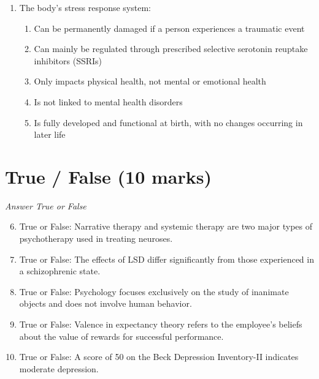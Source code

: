 \documentclass[12pt]{article}
\begin{document}
\begin{enumerate}[label=\arabic*.]
\begin{enumerate}[label=(\alph*)]
    \item Stimulant medications are typically employed to reduce anxiety
    \item Antibiotics are used in the treatment of anxiety
    \item Antifungal drugs are used to treat anxiety disorders
    \item Anti-inflammatory drugs are the primary treatment for anxiety
    \item Hormone replacement therapy is utilized for managing anxiety
\end{enumerate}
\item The body's stress response system:
\begin{enumerate}[label=(\alph*)]
    \item Can be permanently damaged if a person experiences a traumatic event
    \item Can mainly be regulated through prescribed selective serotonin reuptake inhibitors (SSRIs)
    \item Only impacts physical health, not mental or emotional health
    \item Is not linked to mental health disorders
    \item Is fully developed and functional at birth, with no changes occurring in later life
\end{enumerate}
\end{enumerate}

\section*{True / False (10 marks)}
\textit{Answer True or False}
\begin{enumerate}[label=\arabic*.]
\setcounter{enumi}{5}
\item True or False: Narrative therapy and systemic therapy are two major types of psychotherapy used in treating neuroses.
\item True or False: The effects of LSD differ significantly from those experienced in a schizophrenic state.
\item True or False: Psychology focuses exclusively on the study of inanimate objects and does not involve human behavior.
\item True or False: Valence in expectancy theory refers to the employee's beliefs about the value of rewards for successful performance.
\item True or False: A score of 50 on the Beck Depression Inventory-II indicates moderate depression.
\end{enumerate}
\end{document}
